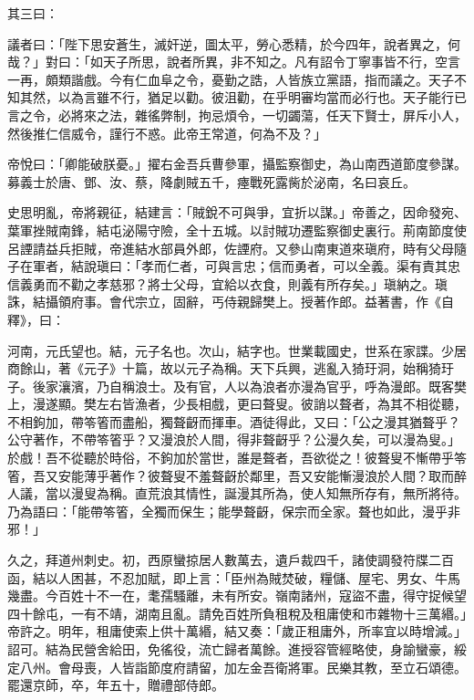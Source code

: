 \begin{pinyinscope}
 其三曰：



 議者曰：「陛下思安蒼生，滅奸逆，圖太平，勞心悉精，於今四年，說者異之，何哉？」對曰：「如天子所思，說者所異，非不知之。凡有詔令丁寧事皆不行，空言一再，頗類諧戲。今有仁血阜之令，憂勤之誥，人皆族立黨語，指而議之。天子不知其然，以為言雖不行，猶足以勸。彼沮勸，在乎明審均當而必行也。天子能行已言之令，必將來之法，雜徭弊制，拘忌煩令，一切蠲蕩，任天下賢士，屏斥小人，然後推仁信威令，謹行不惑。此帝王常道，何為不及？」



 帝悅曰：「卿能破朕憂。」擢右金吾兵曹參軍，攝監察御史，為山南西道節度參謀。募義士於唐、鄧、汝、蔡，降劇賊五千，瘞戰死露胔於泌南，名曰哀丘。



 史思明亂，帝將親征，結建言：「賊銳不可與爭，宜折以謀。」帝善之，因命發宛、葉軍挫賊南鋒，結屯泌陽守險，全十五城。以討賊功遷監察御史裏行。荊南節度使呂諲請益兵拒賊，帝進結水部員外郎，佐諲府。又參山南東道來瑱府，時有父母隨子在軍者，結說瑱曰：「孝而仁者，可與言忠；信而勇者，可以全義。渠有責其忠信義勇而不勸之孝慈邪？將士父母，宜給以衣食，則義有所存矣。」瑱納之。瑱誅，結攝領府事。會代宗立，固辭，丐侍親歸樊上。授著作郎。益著書，作《自釋》，曰：



 河南，元氏望也。結，元子名也。次山，結字也。世業載國史，世系在家諜。少居商餘山，著《元子》十篇，故以元子為稱。天下兵興，逃亂入猗玗洞，始稱猗玗子。後家瀼濱，乃自稱浪士。及有官，人以為浪者亦漫為官乎，呼為漫郎。既客樊上，漫遂顯。樊左右皆漁者，少長相戲，更曰聱叟。彼誚以聱者，為其不相從聽，不相鉤加，帶笭箵而盡船，獨聱齖而揮車。酒徒得此，又曰：「公之漫其猶聱乎？公守著作，不帶笭箵乎？又漫浪於人間，得非聱齖乎？公漫久矣，可以漫為叟。」於戲！吾不從聽於時俗，不鉤加於當世，誰是聱者，吾欲從之！彼聱叟不慚帶乎笭箵，吾又安能薄乎著作？彼聱叟不羞聱齖於鄰里，吾又安能慚漫浪於人間？取而醉人議，當以漫叟為稱。直荒浪其情性，誕漫其所為，使人知無所存有，無所將待。乃為語曰：「能帶笭箵，全獨而保生；能學聱齖，保宗而全家。聱也如此，漫乎非邪！」



 久之，拜道州刺史。初，西原蠻掠居人數萬去，遺戶裁四千，諸使調發符牒二百函，結以人困甚，不忍加賦，即上言：「臣州為賊焚破，糧儲、屋宅、男女、牛馬幾盡。今百姓十不一在，耄孺騷離，未有所安。嶺南諸州，寇盜不盡，得守捉候望四十餘屯，一有不靖，湖南且亂。請免百姓所負租稅及租庸使和市雜物十三萬緡。」帝許之。明年，租庸使索上供十萬緡，結又奏：「歲正租庸外，所率宜以時增減。」詔可。結為民營舍給田，免徭役，流亡歸者萬餘。進授容管經略使，身諭蠻豪，綏定八州。會母喪，人皆詣節度府請留，加左金吾衛將軍。民樂其教，至立石頌德。罷還京師，卒，年五十，贈禮部侍郎。




\end{pinyinscope}

